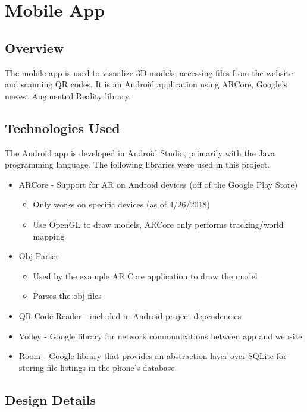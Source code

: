 
\section{Mobile App}

    \subsection{Overview}
The mobile app is used to visualize 3D models, accessing files from the website and scanning QR codes. It is an Android application using ARCore, Google's newest Augmented Reality library.
    \subsection{Technologies Used}
The Android app is developed in Android Studio, primarily with the Java programming language. The following libraries were used in this project.
    \begin{itemize}
        \item ARCore - Support for AR on Android devices (off of the Google Play Store)
        \begin{itemize}
            \item Only works on specific devices (as of 4/26/2018)
            \item Use OpenGL to draw models, ARCore only performs tracking/world mapping
        \end{itemize}
        \item Obj Parser
        \begin{itemize}
            \item Used by the example AR Core application to draw the model
            \item Parses the obj files
        \end{itemize}
        \item QR Code Reader - included in Android project dependencies
        \item Volley - Google library for network communications between app and website
        \item Room - Google library that provides an abstraction layer over SQLite for storing file listings in the phone's database.
    \end{itemize}

    \subsection{Design Details}
    
